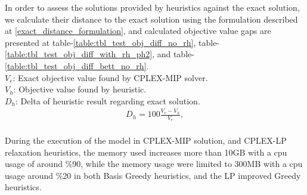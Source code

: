 \documentclass[11pt]{article}
\begin{document}
In order to assess the solutions provided by heuristics against the exact solution, we calculate their distance to the exact solution using the formulation described at \equationautorefname \eqref{exact_distance_formulation}, and calculated objective value gaps are presented at table-\ref{table:tbl_test_obj_diff_no_rh}, table-\ref{table:tbl_test_obj_diff_with_rh_ph2}, and table-\ref{table:tbl_test_obj_diff_bett_no_rh}.\\

\noindent $V_{e}$: Exact objective value found by CPLEX-MIP solver. \\
\noindent $V_{h}$: Objective value found by heuristic. \\
\noindent $D_{h}$: Delta of heuristic result regarding exact solution. \\
\begin{align}
&D_{h} = 100 \frac{V_{e} - V_{h}}{V_{e}}, \label{exact_distance_formulation}&
\end{align}\\


During the execution of the model in CPLEX-MIP solution, and CPLEX-LP relaxation heuristics, the memory used increases more than 10GB with a cpu usage of around \%90, while the memory usage were limited to 300MB with a cpu usage around \%20 in both Basis Greedy heuristics, and the LP improved Greedy heuristics.\\

\end{document}
